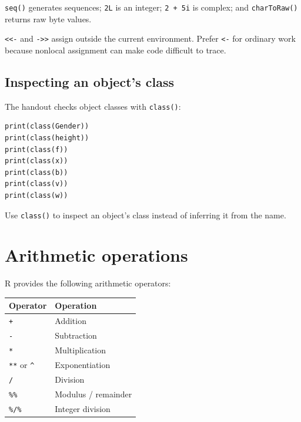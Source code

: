 \texttt{seq()} generates sequences; \texttt{2L} is an integer; \texttt{2 + 5i} is complex; and \texttt{charToRaw()} returns raw byte values.

\begin{pitfall}
\texttt{<<-} and \texttt{->>} assign outside the current environment. Prefer \texttt{<-} for ordinary work because nonlocal assignment can make code difficult to trace.
\end{pitfall}

\subsection{Inspecting an object's class}

The handout checks object classes with \texttt{class()}:

\begin{lstlisting}[style=dsr]
print(class(Gender))
print(class(height))
print(class(f))
print(class(x))
print(class(b))
print(class(v))
print(class(w))
\end{lstlisting}

\begin{keyidea}
Use \texttt{class()} to inspect an object's class instead of inferring it from the name.
\end{keyidea}

\section{Arithmetic operations}

R provides the following arithmetic operators:

\begin{dstable}
\begin{tabularx}{\linewidth}{@{}p{2.2cm}X@{}}
\toprule
\rowcolor{DSPaleBlue!92}
Operator & Operation \\
\midrule
\texttt{+} & Addition \\
\texttt{-} & Subtraction \\
\texttt{*} & Multiplication \\
\texttt{**} or \texttt{\^} & Exponentiation \\
\texttt{/} & Division \\
\texttt{\%\%} & Modulus / remainder \\
\texttt{\%/\%} & Integer division \\
\bottomrule
\end{tabularx}
\end{dstable}

